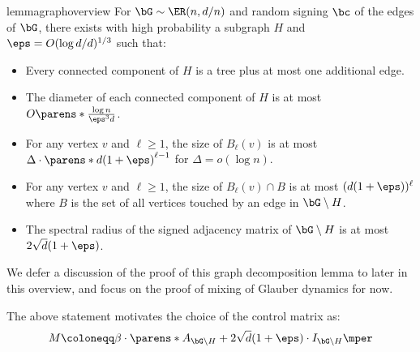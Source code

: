 \documentclass[11pt,letterpaper]{article}
\begin{document}
\begin{restatable}{lemma}{graphoverview}\label{lem:graph-decomp-overview}
    For $\bG\sim \ER(n,d/n)$ and random signing $\bc$ of the edges of $\bG$, there exists with high probability a subgraph $H$ and $\eps = O(\log d / d)^{1/3}$ such that:
    \begin{itemize}
        \item Every connected component of $H$ is a tree plus at most one additional edge.
        \item The diameter of each connected component of $H$ is at most $O\parens*{\frac{\log n}{\eps^3 d}}$.
        \item For any vertex $v$ and $\ell \ge 1$, the size of $B_{\ell}(v)$ is at most $\Delta \cdot \parens*{d(1+\eps)}^{\ell-1}$ for $\Delta = o(\log n)$.
        \item For any vertex $v$ and $\ell \ge 1$, the size of $B_{\ell}(v) \cap B$ is at most $(d(1+\eps))^{\ell}$ where $B$ is the set of all vertices touched by an edge in $\bG\setminus H$.
        \item The spectral radius of the signed adjacency matrix of $\bG\setminus H$ is at most $2\sqrt{d}(1+\eps)$.
    \end{itemize}
\end{restatable}
We defer a discussion of the proof of this graph decomposition lemma to later in this overview, and focus on the proof of mixing of Glauber dynamics for now.

The above statement motivates the choice of the control matrix as:
\[
    M\coloneqq\beta\cdot\parens*{ A_{\bG \setminus H} + 2\sqrt{d}(1+\eps)\cdot I_{\bG\setminus H}}\mper
\]
\end{document}
